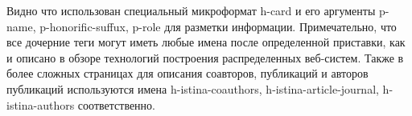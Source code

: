 \begin{Shaded}
\begin{Highlighting}[]
\FunctionTok{\{}
    \FunctionTok{:} \OtherTok{[}
        \FunctionTok{\{}
            \FunctionTok{:} \OtherTok{[}
            \OtherTok{]}\FunctionTok{,}
            \FunctionTok{:} \FunctionTok{\{}
                \FunctionTok{:} \OtherTok{[}
                \OtherTok{]}\FunctionTok{,}
                \FunctionTok{:} \OtherTok{[}
                \OtherTok{]}\FunctionTok{,}
                \FunctionTok{:} \OtherTok{[}
                \OtherTok{]}
            \FunctionTok{\}}
        \FunctionTok{\}}
    \OtherTok{]}\FunctionTok{,}
    \FunctionTok{:} \FunctionTok{\{}
        \FunctionTok{:} \OtherTok{[}
        \OtherTok{]}
    \FunctionTok{\},}
    \FunctionTok{:} \FunctionTok{\{}
        \FunctionTok{:} \FunctionTok{\{}
            \FunctionTok{:} \FunctionTok{,}
            \FunctionTok{:} \OtherTok{[}
            \OtherTok{]}
        \FunctionTok{\}}
    \FunctionTok{\},}
    \FunctionTok{:} \FunctionTok{\{}
        \FunctionTok{:} \FunctionTok{,}
        \FunctionTok{:} \FunctionTok{,}
        \FunctionTok{:} \FunctionTok{,}
        \FunctionTok{:} 
    \FunctionTok{\}}
\FunctionTok{\}}
\end{Highlighting}
\end{Shaded}

Видно что использован специальный микроформат h-card и его аргументы
p-name, p-honorific-suffux, p-role для разметки информации.
Примечательно, что все дочерние теги могут иметь любые имена после
определенной приставки, как и описано в обзоре технологий построения
распределенных веб-систем. Также в более сложных страницах для описания
соавторов, публикаций и авторов публикаций используются имена
h-istina-coauthors, h-istina-article-journal, h-istina-authors
соответственно.

